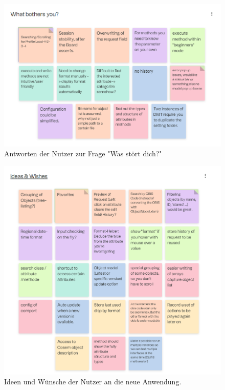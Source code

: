 \begin{figure}[H]
   \centering
   \includegraphics[width=1.0\textwidth]{gfx/S1_RetroBoard_WhatBothersYou.png}
   \caption{
       Antworten der Nutzer zur Frage "Was stört dich?"
   }
   \label{fig:WhatBothersYou}
\end{figure}

\begin{figure}[H]
   \centering
   \includegraphics[width=1.0\textwidth]{gfx/S1_RetroBoard_IdeasAndWishes.png}
   \caption{
       Ideen und Wünsche der Nutzer an die neue Anwendung.
   }
   \label{fig:IdeasAndWishes}
\end{figure}

